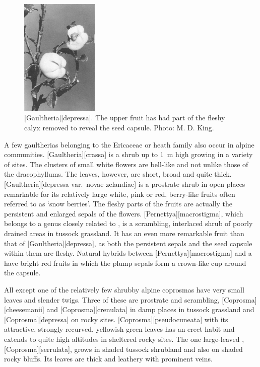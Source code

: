 \begin{figure}
	\includegraphics[width=0.33\textwidth]{graphics/figure94gaultheria.jpg}
	\centering
	\caption[\emph{Gaultheria depressa}]{[Gaultheria][depressa].
	The upper fruit has had part of the fleshy calyx removed to reveal the seed capsule.
	Photo: M. D. King.}%
	\label{fig:94gaultheria}
\end{figure}

A few gaultherias belonging to the Ericaceae or heath family also occur in alpine communities. [Gaultheria][crassa] is a shrub up to \SI{1}{\metre} high growing in a variety of sites.
The clusters of small white flowers are bell-like and not unlike those of the dracophyllums.
The leaves, however, are short, broad and quite thick. [Gaultheria][depressa var.\ novae-zelandiae] is a prostrate shrub in open places remarkable for its relatively large white, pink or red, berry-like fruits often referred to as `snow berries'.
The fleshy parts of the fruits are actually the persistent and enlarged sepals of the flowers. [Pernettya][macrostigma], which belongs to a genus closely related to , is a scrambling, interlaced shrub of poorly drained areas in tussock grassland.
It has an even more remarkable fruit than that of [Gaultheria][depressa], as both the persistent sepals and the seed capsule within them are fleshy.
Natural hybrids between [Pernettya][macrostigma] and a  have bright red fruits in which the plump sepals form a crown-like cup around the capsule.

All except one of the relatively few shrubby alpine coprosmas have very small leaves and slender twigs.
Three of these are prostrate and scrambling, [Coprosma][cheesemanii]  and [Coprosma][crenulata] in damp places in tussock grassland and [Coprosma][depressa]  on rocky sites. [Coprosma][pseudocuneata] with its attractive, strongly recurved, yellowish green leaves has an erect habit and extends to quite high altitudes in sheltered rocky sites.
The one large-leaved , [Coprosma][serrulata], grows in shaded tussock shrubland  and also on shaded rocky bluffs.
Its leaves are thick and leathery with prominent veins.

